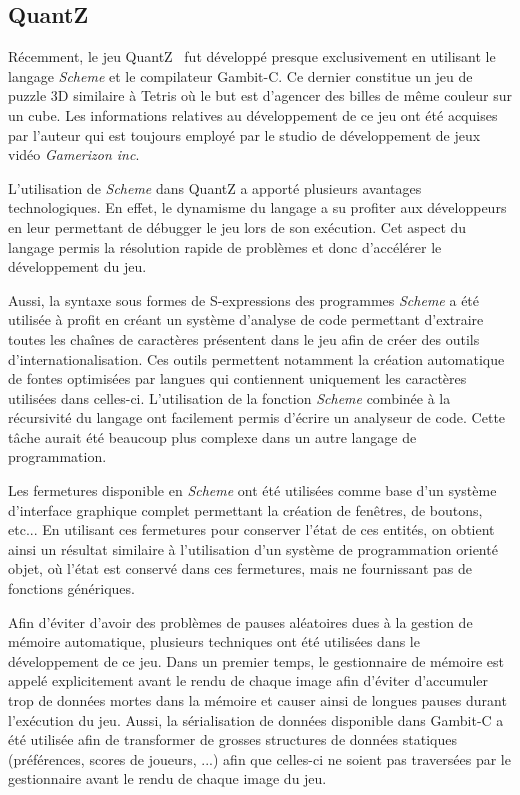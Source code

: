 \documentclass[12pt,twoside,letterpaper,francais]{book}
\newcommand{\Schemelang}{{\textit{Scheme }}}
\newcommand{\scheme}[1]{\selectlanguage{english}{\tt #1}\selectlanguage{french}}
\begin{document}
\FloatBarrier
\subsection{QuantZ}
Récemment, le jeu QuantZ~\cite{Quantz} fut développé presque
exclusivement en utilisant le langage \Schemelang et le compilateur
Gambit-C. Ce dernier constitue un jeu de puzzle 3D similaire à Tetris
où le but est d'agencer des billes de même couleur sur un cube. Les
informations relatives au développement de ce jeu ont été acquises par
l'auteur qui est toujours employé par le studio de développement de
jeux vidéo \textit{Gamerizon inc}.

L'utilisation de \Schemelang dans QuantZ a apporté plusieurs avantages
technologiques. En effet, le dynamisme du langage a su profiter aux
développeurs en leur permettant de débugger le jeu lors de son
exécution. Cet aspect du langage permis la résolution rapide de
problèmes et donc d'accélérer le développement du jeu.

Aussi, la syntaxe sous formes de S-expressions des programmes
\Schemelang a été utilisée à profit en créant un système d'analyse de
code permettant d'extraire toutes les chaînes de caractères présentent
dans le jeu afin de créer des outils d'internationalisation. Ces
outils permettent notamment la création automatique de fontes
optimisées par langues qui contiennent uniquement les caractères
utilisées dans celles-ci. L'utilisation de la fonction \Schemelang
\scheme{read} combinée à la récursivité du langage ont facilement
permis d'écrire un analyseur de code. Cette tâche aurait été beaucoup
plus complexe dans un autre langage de programmation.

Les fermetures disponible en \Schemelang ont été utilisées comme base d'un
système d'interface graphique complet permettant la création de
fenêtres, de boutons, etc... En utilisant ces fermetures pour
conserver l'état de ces entités, on obtient ainsi un résultat
similaire à l'utilisation d'un système de programmation orienté objet,
où l'état est conservé dans ces fermetures, mais ne fournissant pas de
fonctions génériques.

Afin d'éviter d'avoir des problèmes de pauses aléatoires dues à la
gestion de mémoire automatique, plusieurs techniques ont été utilisées
dans le développement de ce jeu. Dans un premier temps, le
gestionnaire de mémoire est appelé explicitement avant le rendu de
chaque image afin d'éviter d'accumuler trop de données mortes dans la
mémoire et causer ainsi de longues pauses durant l'exécution du
jeu. Aussi, la sérialisation de données disponible dans Gambit-C a été
utilisée afin de transformer de grosses structures de données
statiques (préférences, scores de joueurs, ...) afin que celles-ci ne
soient pas traversées par le gestionnaire avant le rendu de chaque
image du jeu.
\end{document}
